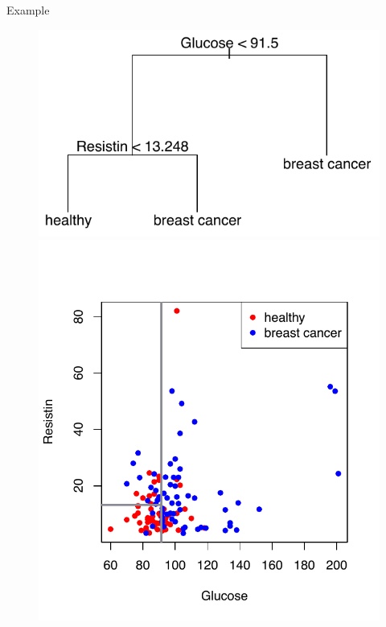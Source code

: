 \documentclass[notes]{beamer}          %
\begin{document}
\begin{frame}{Example}
 \begin{figure}
  \includegraphics[width=\linewidth]{../figures/week_2_classification/breast_cancer_tree.pdf}  
\endminipage\hfill
{}%
  \includegraphics[width=\linewidth]{../figures/week_2_classification/breast_cancer_2Dscatterplot_vhlines.pdf}  
\endminipage
\end{figure}
\end{frame}
\end{document}
